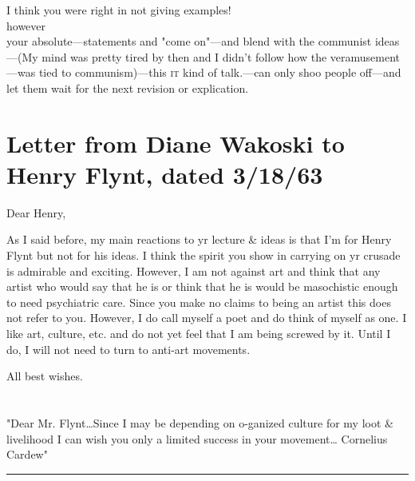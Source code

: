 \vfill
\noindent I think you were right in not giving examples! \\
\vfill
\noindent however \\
your absolute---statements and "come on"---and blend with the communist 
ideas---(My mind was pretty tired by then and I didn't follow how the 
veramusement---was tied to communism)---this \textsc{it} kind of talk.---can only shoo 
people off---and let them wait for the next revision or explication. 

\vfill


\clearpage

\section*{}

\section*{{\normalsize Letter from Diane Wakoski to Henry Flynt, dated 3/18/63}}

\vfill
\vfill

Dear Henry, 

\vfill

As I said before, my main reactions to yr lecture \& ideas is that I'm for 
Henry Flynt but not for his ideas. I think the spirit you show in carrying on 
yr crusade is admirable and exciting. However, I am not against art and think 
that any artist who would say that he is or think that he is would be 
masochistic enough to need psychiatric care. Since you make no claims to 
being an artist this does not refer to you. However, I do call myself a poet 
and do think of myself as one. I like art, culture, etc. and do not yet feel 
that I am being screwed by it. Until I do, I will not need to turn to anti-art 
movements. 

All best wishes. 

\vfill


\vfill
\vfill

\clearpage

\section*{}

\vfill

"Dear Mr. Flynt\ldots Since I may be depending on o-ganized culture for my 
loot \& livelihood I can wish you only a limited success in your movement\ldots 
Cornelius Cardew" 
\plainbreak{2}

\vfill

\clearpage

